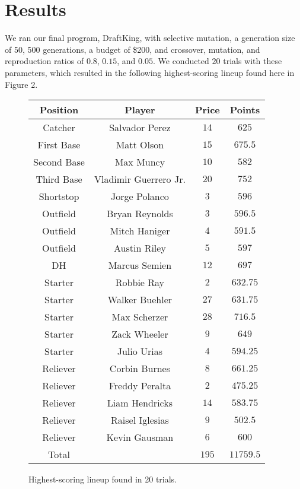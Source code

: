 
\section{Results}
\label{sec:results}

We ran our final program, DraftKing, with selective mutation, a generation size of 50, 500 generations, a budget of \$200, and crossover, mutation, and reproduction ratios of $0.8$, $0.15$, and $0.05$. We conducted $20$ trials with these parameters, which resulted in the following highest-scoring lineup found here in Figure 2.

\begin{figure}[htb]
  \centering 
  \begin{tabular}{|c|c|c|c|} 
    \hline \hline 
    Position & Player & Price & Points \\ 
    \hline 
    Catcher & Salvador Perez & $14$ & $625$ \\
    First Base & Matt Olson & $15$ & $675.5$ \\
    Second Base & Max Muncy & $10$ & $582$ \\
    Third Base & Vladimir Guerrero Jr. & $20$ & $752$ \\
    Shortstop & Jorge Polanco & $3$ & $596$ \\
    Outfield & Bryan Reynolds & $3$ & $596.5$ \\
    Outfield & Mitch Haniger & $4$ & $591.5$ \\
    Outfield & Austin Riley & $5$ & $597$ \\
    DH & Marcus Semien & $12$ & $697$ \\
    Starter & Robbie Ray & $2$ & $632.75$ \\
    Starter & Walker Buehler & $27$ & $631.75$ \\
    Starter & Max Scherzer & $28$ & $716.5$ \\
    Starter & Zack Wheeler & $9$ & $649$ \\
    Starter & Julio Urias & $4$ & $594.25$ \\
    Reliever & Corbin Burnes & $8$ & $661.25$ \\
    Reliever & Freddy Peralta & $2$ & $475.25$ \\
    Reliever & Liam Hendricks & $14$ & $583.75$ \\
    Reliever & Raisel Iglesias & $9$ & $502.5$ \\
    Reliever & Kevin Gausman & $6$ & $600$ \\
    \hline 
    Total & & $195$ & $11759.5$ \\
    \hline \hline
  \end{tabular}

  \caption{Highest-scoring lineup found in 20 trials.}
  \label{tab:example}

\end{figure}

